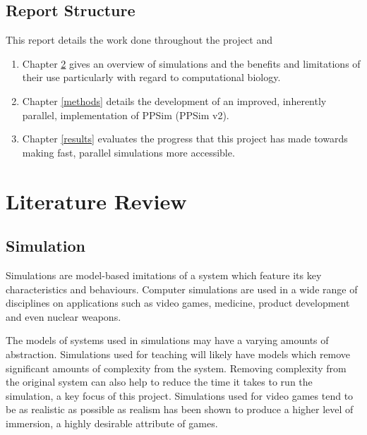 \documentclass{UoYCSproject}
\begin{document}
\section{Report Structure}
This report details the work done throughout the project and 

\begin{enumerate}
	\item Chapter \ref{lit_review} gives an overview of simulations and the benefits and limitations of their use particularly with regard to computational biology.
	\item Chapter \ref{methods} details the development of an improved, inherently parallel, implementation of PPSim (PPSim v2).
	\item Chapter \ref{results} evaluates the progress that this project has made towards making fast, parallel simulations more accessible.
\end{enumerate}

\chapter{Literature Review}
\label{lit_review}
%

\section{Simulation}
\label{simulation}
Simulations are model-based imitations of a system which feature its key characteristics and behaviours. Computer simulations are used in a wide range of disciplines on applications such as video games, medicine, product development and even nuclear weapons.

The models of systems used in simulations may have a varying amounts of abstraction. Simulations used for teaching will likely have models which remove significant amounts of complexity from the system. Removing complexity from the original system can also help to reduce the time it takes to run the simulation, a key focus of this project. Simulations used for video games tend to be as realistic as possible as realism has been shown to produce a higher level of immersion\cite{realism_immersion}, a highly desirable attribute of games.
\end{document}

